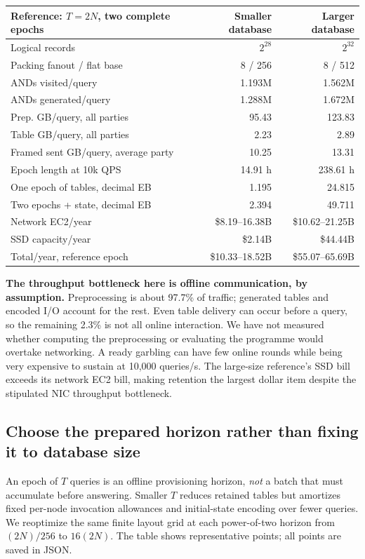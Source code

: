 \begin{center}\small\begin{tabular}{lrr}\toprule
Reference: $T=2N$, two complete epochs & Smaller database & Larger database\\\midrule
Logical records & $2^{28}$ & $2^{32}$ \\
Packing fanout / flat base & 8 / 256 & 8 / 512 \\
ANDs visited/query & 1.193M & 1.562M \\
ANDs generated/query & 1.288M & 1.672M \\
Prep. GB/query, all parties & 95.43 & 123.83 \\
Table GB/query, all parties & 2.23 & 2.89 \\
Framed sent GB/query, average party & 10.25 & 13.31 \\
Epoch length at 10k QPS & 14.91 h & 238.61 h \\
One epoch of tables, decimal EB & 1.195 & 24.815 \\
Two epochs + state, decimal EB & 2.394 & 49.711 \\
Network EC2/year & \$8.19--16.38B & \$10.62--21.25B \\
SSD capacity/year & \$2.14B & \$44.44B \\
Total/year, reference epoch & \$10.33--18.52B & \$55.07--65.69B \\
\bottomrule\end{tabular}\end{center}

\textbf{The throughput bottleneck here is offline communication, by assumption.}
Preprocessing is about 97.7\% of traffic; generated tables and encoded I/O account
for the rest. Even table delivery can occur before a query, so the remaining
2.3\% is not all online interaction. We have not measured whether computing the
preprocessing or evaluating the programme would overtake networking. A ready
garbling can have few online rounds while being very expensive to sustain at
10,000 queries/s. The large-size reference's SSD bill exceeds its network EC2
bill, making retention the largest dollar item despite the stipulated NIC
throughput bottleneck.

\subsection{Choose the prepared horizon rather than fixing it to database size}
An epoch of $T$ queries is an offline provisioning horizon, \emph{not} a batch
that must accumulate before answering. Smaller $T$ reduces retained tables but
amortizes fixed per-node invocation allowances and initial-state encoding over
fewer queries. We reoptimize the same finite layout grid at each power-of-two
horizon from $(2N)/256$ to $16(2N)$. The table shows representative points; all
points are saved in JSON.


